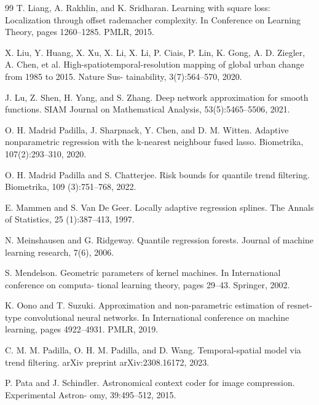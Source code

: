 \documentclass[twoside,11pt]{article}
\begin{document}
\begin{thebibliography}{99}
 T. Liang, A. Rakhlin, and K. Sridharan. Learning with square loss: Localization through offset rademacher complexity. In Conference on Learning Theory, pages 1260--1285. PMLR, 2015.

 X. Liu, Y. Huang, X. Xu, X. Li, X. Li, P. Ciais, P. Lin, K. Gong, A. D. Ziegler, A. Chen, et al. High-spatiotemporal-resolution mapping of global urban change from 1985 to 2015. Nature Sus- tainability, 3(7):564--570, 2020.

 J. Lu, Z. Shen, H. Yang, and S. Zhang. Deep network approximation for smooth functions. SIAM Journal on Mathematical Analysis, 53(5):5465--5506, 2021.

 O. H. Madrid Padilla, J. Sharpnack, Y. Chen, and D. M. Witten. Adaptive nonparametric regression with the k-nearest neighbour fused lasso. Biometrika, 107(2):293--310, 2020.

 O. H. Madrid Padilla and S. Chatterjee. Risk bounds for quantile trend filtering. Biometrika, 109 (3):751--768, 2022.

 E. Mammen and S. Van De Geer. Locally adaptive regression splines. The Annals of Statistics, 25 (1):387--413, 1997.

 N. Meinshausen and G. Ridgeway. Quantile regression forests. Journal of machine learning research, 7(6), 2006.

 S. Mendelson. Geometric parameters of kernel machines. In International conference on computa- tional learning theory, pages 29--43. Springer, 2002.

 K. Oono and T. Suzuki. Approximation and non-parametric estimation of resnet-type convolutional neural networks. In International conference on machine learning, pages 4922--4931. PMLR, 2019.

 C. M. M. Padilla, O. H. M. Padilla, and D. Wang. Temporal-spatial model via trend filtering. arXiv preprint arXiv:2308.16172, 2023.

 P. Pata and J. Schindler. Astronomical context coder for image compression. Experimental Astron- omy, 39:495--512, 2015.


\end{thebibliography}
\end{document}
